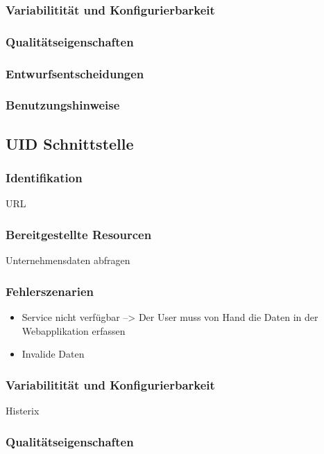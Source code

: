 \subsubsection{Variabilitität und Konfigurierbarkeit}

\subsubsection{Qualitätseigenschaften}

\subsubsection{Entwurfsentscheidungen} 

\subsubsection{Benutzungshinweise} 

\subsection{UID Schnittstelle}

\subsubsection{Identifikation}
URL

\subsubsection{Bereitgestellte Resourcen}
Unternehmensdaten abfragen

\subsubsection{Fehlerszenarien}
\begin{itemize}
	\item Service nicht verfügbar --> Der User muss von Hand die Daten in der Webapplikation erfassen
	\item Invalide Daten 
\end{itemize}



\subsubsection{Variabilitität und Konfigurierbarkeit}
Histerix

\subsubsection{Qualitätseigenschaften}

